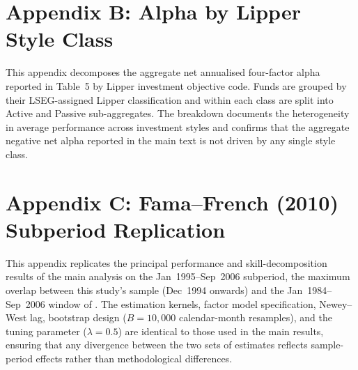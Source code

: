 \documentclass[12pt]{article}
\begin{document}



\clearpage
\section*{Appendix B: Alpha by Lipper Style Class}
\label{app:lipper}
\setcounter{table}{0}
\renewcommand{\thetable}{B.\arabic{table}}
\setcounter{figure}{0}
\renewcommand{\thefigure}{B.\arabic{figure}}

This appendix decomposes the aggregate net annualised \textcite{Carhart1997}
four-factor alpha reported in Table~5 by Lipper investment objective code.
Funds are grouped by their LSEG-assigned Lipper classification and within each
class are split into Active and Passive sub-aggregates. The breakdown documents
the heterogeneity in average performance across investment styles and confirms
that the aggregate negative net alpha reported in the main text is not driven
by any single style class.




\clearpage
\section*{Appendix C: Fama--French (2010) Subperiod Replication}
\label{app:ff_subperiod}
\setcounter{table}{0}
\renewcommand{\thetable}{C.\arabic{table}}
\setcounter{figure}{0}
\renewcommand{\thefigure}{C.\arabic{figure}}

This appendix replicates the principal performance and skill-decomposition
results of the main analysis on the Jan~1995--Sep~2006 subperiod, the maximum
overlap between this study's sample (Dec~1994 onwards) and the
Jan~1984--Sep~2006 window of \textcite{FamaFrench2010}. The estimation kernels,
factor model specification, Newey--West lag, bootstrap design ($B = 10{,}000$
calendar-month resamples), and the \textcite{Storey2002} tuning parameter
($\lambda = 0.5$) are identical to those used in the main results, ensuring
that any divergence between the two sets of estimates reflects sample-period
effects rather than methodological differences.
\end{document}
